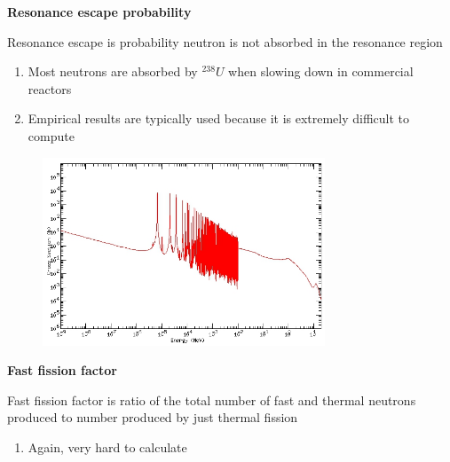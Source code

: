 \documentclass[aspectratio=1610,pdftex,dvipsnames,compress,xcolor={dvipsnames}]{beamer}
\begin{document}
\begin{frame}[plain]{}
    \centering\LARGE\textbf{Resonance escape probability}
\end{frame}


\addtocounter{framenumber}{-1} 
\begin{frame}{Resonance escape is probability neutron is not absorbed in the resonance region}
    \begin{enumerate}[series=outerlist,topsep=0pt,itemsep=21pt,leftmargin=*,label=(\arabic*)]
        \item[]Most neutrons are absorbed by $^{238}U$ when slowing down in commercial reactors
        \item[]Empirical results are typically used because it is extremely difficult to compute
    \end{enumerate}
\end{frame}


\begin{frame}{}
    \begin{figure}
        \centering
        \includegraphics[width=0.75\textwidth]{fission.cross.section.jpg}
    \end{figure}
\end{frame}


\begin{frame}[plain]{}
    \centering\LARGE\textbf{Fast fission factor}
\end{frame}


\addtocounter{framenumber}{-1} 
\begin{frame}{Fast fission factor is ratio of the total number of fast and thermal neutrons produced to number produced by just thermal fission}
    \begin{enumerate}[series=outerlist,topsep=0pt,itemsep=21pt,leftmargin=*,label=(\arabic*)]
        \item[]Again, very hard to calculate
    \end{enumerate}
\end{frame}
\end{document}
